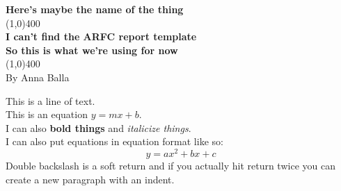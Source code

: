 \documentclass[11pt]{article}
\begin{document}
\begin{titlepage}
\begin{center}
\vspace*{1cm}
\Large{\textbf{Here's maybe the name of the thing}}\\
\vfill
\line(1,0){400}\\[1mm]
\Huge{\textbf{I can't find the ARFC report template}}\\[3mm]
\Large{\textbf{So this is what we're using for now}}\\[1mm]
\line(1,0){400}\\
\vfill
\large{By Anna Balla}
\end{center}
\end{titlepage}

\pagebreak

\tableofcontents
\thispagestyle{empty}
\clearpage

\setcounter{page}{1}


This is a line of text.\\ 
This is an equation $y=mx+b$.\\
I can also \textbf{bold things} and \textit{italicize things}.\\
I can also put equations in equation format like so: $$y=ax^2+bx+c$$
Double backslash is a soft return and if you actually hit return twice you can create a new paragraph with an indent.
\end{document}
